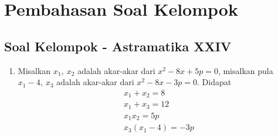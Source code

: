 \chapter{Pembahasan Soal Kelompok}
\hrulefill

\section{Soal Kelompok - Astramatika XXIV}
\begin{enumerate}
\item Misalkan $x_1,\ x_2$ adalah akar-akar dari $x^2-8x+5p=0$, misalkan pula $x_1 - 4,\ x_3$ adalah akar-akar dari $x^2-8x-3p=0$. Didapat
	\begin{gather}
	x_1 + x_2 = 8\\
	x_1 + x_3 = 12\\
	x_1x_2 = 5p\\
	x_3(x_1-4) = -3p
	\end{gather}
\end{enumerate}
